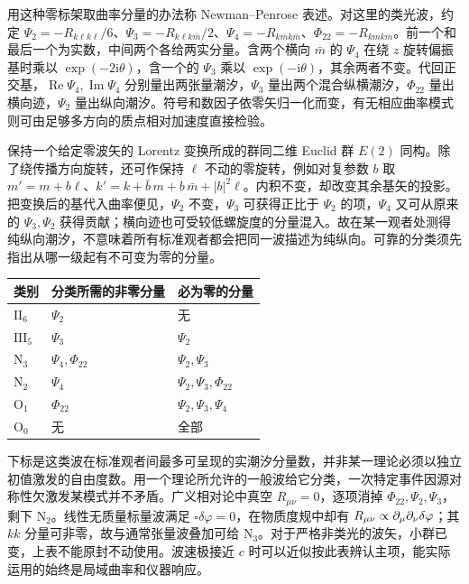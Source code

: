 用这种零标架取曲率分量的办法称 Newman--Penrose 表述。对这里的类光波，约定 $\Psi_2=-R_{k\ell k\ell}/6$、$\Psi_3=-R_{k\ell k\bar m}/2$、$\Psi_4=-R_{k\bar m k\bar m}$、$\Phi_{22}=-R_{kmk\bar m}$。前一个和最后一个为实数，中间两个各给两实分量。含两个横向 $\bar m$ 的 $\Psi_4$ 在绕 $z$ 旋转偏振基时乘以 $\exp(-2\mathrm i\theta)$，含一个的 $\Psi_3$ 乘以 $\exp(-\mathrm i\theta)$，其余两者不变。代回正交基，$\operatorname{Re}\Psi_4,\operatorname{Im}\Psi_4$ 分别量出两张量潮汐，$\Psi_3$ 量出两个混合纵横潮汐，$\Phi_{22}$ 量出横向迹，$\Psi_2$ 量出纵向潮汐。符号和数因子依零矢归一化而变，有无相应曲率模式则可由足够多方向的质点相对加速度直接检验。

保持一个给定零波矢的 Lorentz 变换所成的群同二维 Euclid 群 $E(2)$ 同构。除了绕传播方向旋转，还可作保持 $\ell$ 不动的零旋转，例如对复参数 $b$ 取 $m'=m+b\ell$、$k'=k+\bar b\,m+b\,\bar m+|b|^2\ell$。内积不变，却改变其余基矢的投影。把变换后的基代入曲率便见，$\Psi_2$ 不变，$\Psi_3$ 可获得正比于 $\Psi_2$ 的项，$\Psi_4$ 又可从原来的 $\Psi_3,\Psi_2$ 获得贡献；横向迹也可受较低螺旋度的分量混入。故在某一观者处测得纯纵向潮汐，不意味着所有标准观者都会把同一波描述为纯纵向。可靠的分类须先指出从哪一级起有不可变为零的分量。

\begin{center}
\begin{tabular}{lll}
\hline
类别 & 分类所需的非零分量 & 必为零的分量\\ \hline
$\mathrm{II}_6$ & $\Psi_2$ & 无\\
$\mathrm{III}_5$ & $\Psi_3$ & $\Psi_2$\\
$\mathrm N_3$ & $\Psi_4,\Phi_{22}$ & $\Psi_2,\Psi_3$\\
$\mathrm N_2$ & $\Psi_4$ & $\Psi_2,\Psi_3,\Phi_{22}$\\
$\mathrm O_1$ & $\Phi_{22}$ & $\Psi_2,\Psi_3,\Psi_4$\\
$\mathrm O_0$ & 无 & 全部\\ \hline
\end{tabular}
\end{center}
下标是这类波在标准观者间最多可呈现的实潮汐分量数，并非某一理论必须以独立初值激发的自由度数。用一个理论所允许的一般波给它分类，一次特定事件因源对称性欠激发某模式并不矛盾。广义相对论中真空 $R_{\mu\nu}=0$，逐项消掉 $\Phi_{22},\Psi_2,\Psi_3$，剩下 $\mathrm N_2$。线性无质量标量波满足 $\square\delta\varphi=0$，在物质度规中却有 $R_{\mu\nu}\propto\partial_\mu\partial_\nu\delta\varphi$；其 $kk$ 分量可非零，故与通常张量波叠加可给 $\mathrm N_3$。对于严格非类光的波矢，小群已变，上表不能原封不动使用。波速极接近 $c$ 时可以近似按此表辨认主项，能实际运用的始终是局域曲率和仪器响应。

